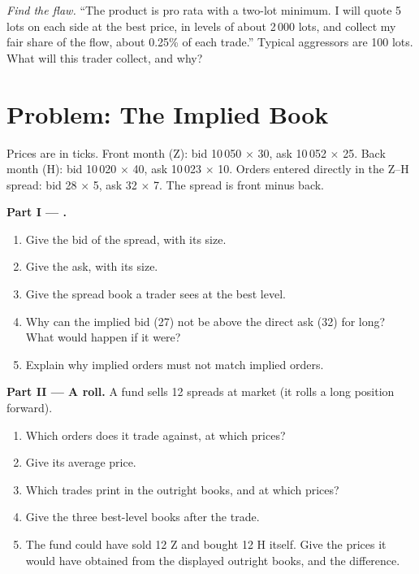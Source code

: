 \begin{exercise}[$\star\star\star$]\label{exo:m1:matching-algorithms-and-implied-spreads:8}
\emph{Find the flaw.} ``The product is pro rata with a two-lot minimum. I
will quote 5 lots on each side at the best price, in levels of about 2\,000
lots, and collect my fair share of the flow, about 0.25\% of each trade.''
Typical aggressors are 100 lots. What will this trader collect, and why?
\end{exercise}

\section{Problem: The Implied Book}

\begin{problem}\label{pb:m1:matching-algorithms-and-implied-spreads:1}
Prices are in ticks. Front month (Z): bid 10\,050 $\times$ 30, ask 10\,052
$\times$ 25. Back month (H): bid 10\,020 $\times$ 40, ask 10\,023 $\times$ 10.
Orders entered directly in the Z--H spread: bid 28 $\times$ 5, ask 32 $\times$
7. The spread is front minus back.

\medskip\noindent\textbf{Part I --- .}
\begin{enumerate}
\item Give the  bid of the spread, with its size.
\item Give the  ask, with its size.
\item Give the spread book a trader sees at the best level.
\item Why can the implied bid (27) not be above the direct ask (32) for
long? What would happen if it were?
\item Explain why implied orders must not match implied orders.
\end{enumerate}

\medskip\noindent\textbf{Part II --- A roll.}
A fund sells 12 spreads at market (it rolls a long position forward).
\begin{enumerate}[resume]
\item Which orders does it trade against, at which prices?
\item Give its average price.
\item Which trades print in the outright books, and at which prices?
\item Give the three best-level books after the trade.
\item The fund could have sold 12 Z and bought 12 H itself. Give the prices it
would have obtained from the displayed outright books, and the difference.
\end{enumerate}


\end{problem}
